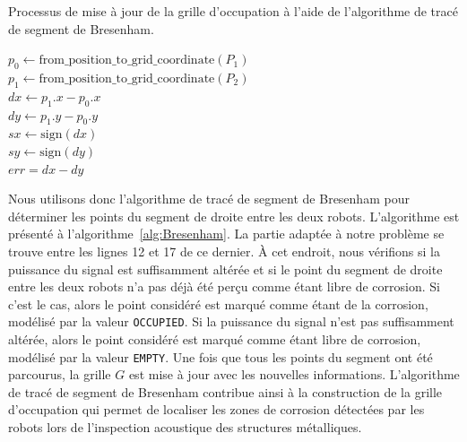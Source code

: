 \documentclass[francais,RandD]{rapportPFE}
\begin{document}
			\begin{algorithm}[h!]
				\caption{Processus de mise à jour de la grille d'occupation à l'aide de l'algorithme de tracé de segment de Bresenham.}
				\label{alg:Bresenham}
				$p_0 \gets \text{from\_position\_to\_grid\_coordinate}(P_1)$ \\
				$p_1 \gets \text{from\_position\_to\_grid\_coordinate}(P_2)$ \\
				$dx \gets p_1.x - p_0.x$ \\
				$dy \gets p_1.y - p_0.y$ \\
				$sx \gets \text{sign}(dx)$ \\
				$sy \gets \text{sign}(dy)$ \\
				$err = dx - dy$ \\
			\end{algorithm}

			Nous utilisons donc l'algorithme de tracé de segment de Bresenham pour déterminer les points du segment de droite entre les deux robots.
			L'algorithme est présenté à l'algorithme~\ref{alg:Bresenham}. La partie adaptée à notre problème se trouve entre les lignes 12 et 17 de ce dernier.
			À cet endroit, nous vérifions si la puissance du signal est suffisamment altérée et si le point du segment de droite entre les deux robots n'a pas déjà été perçu comme étant libre de corrosion.
			Si c'est le cas, alors le point considéré est marqué comme étant de la corrosion, modélisé par la valeur \texttt{OCCUPIED}.
			Si la puissance du signal n'est pas suffisamment altérée, alors le point considéré est marqué comme étant libre de corrosion, modélisé par la valeur \texttt{EMPTY}.
			Une fois que tous les points du segment ont été parcourus, la grille $G$ est mise à jour avec les nouvelles informations.
			L'algorithme de tracé de segment de Bresenham contribue ainsi à la construction de la grille d'occupation qui permet de localiser les zones de corrosion détectées par les robots lors de l'inspection acoustique des structures métalliques.
\end{document}
